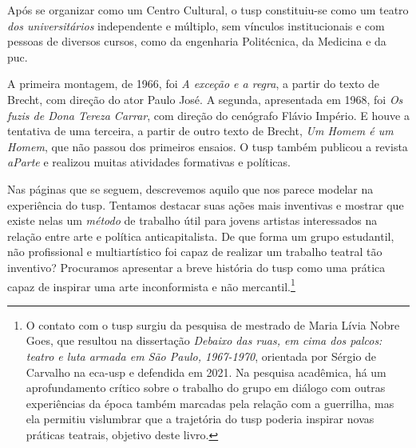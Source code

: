 Após se organizar como um Centro Cultural, o {\sc tusp} constituiu-se como um
teatro {\it dos universitários} independente e múltiplo, sem vínculos
institucionais e com pessoas de diversos cursos, como da engenharia
Politécnica, da Medicina e da {\sc puc}.


A primeira montagem, de 1966, foi {\it A exceção e a regra}, a partir do
texto de Brecht, com direção do ator Paulo José. A segunda, apresentada
em 1968, foi {\it Os fuzis de Dona Tereza Carrar}, com direção do
cenógrafo Flávio Império. E houve a tentativa de uma terceira, a partir
de outro texto de Brecht, {\it Um Homem é um Homem}, que não passou dos
primeiros ensaios. O {\sc tusp} também publicou a revista {\it aParte} e realizou
muitas atividades formativas e políticas.

Nas páginas que se seguem, descrevemos aquilo que nos parece modelar na
experiência do {\sc tusp}. Tentamos destacar suas ações mais inventivas e
mostrar que existe nelas um {\it método} de trabalho útil para jovens
artistas interessados na relação entre arte e política anticapitalista.
De que forma um grupo estudantil, não profissional e multiartístico foi
capaz de realizar um trabalho teatral tão inventivo? Procuramos
apresentar a breve história do {\sc tusp} como uma prática capaz de inspirar
uma arte inconformista e não mercantil.\footnote{O contato com o
  {\sc tusp} surgiu da pesquisa de mestrado de Maria Lívia Nobre Goes, que
  resultou na dissertação {\it Debaixo das ruas, em cima dos palcos:
  teatro e luta armada em São Paulo, 1967-1970}, orientada por Sérgio de
  Carvalho na {\sc eca-usp} e defendida em 2021. Na pesquisa acadêmica, há um
  aprofundamento crítico sobre o trabalho do grupo em diálogo com outras
  experiências da época também marcadas pela relação com a guerrilha,
  mas ela permitiu vislumbrar que a trajetória do {\sc tusp} poderia inspirar
  novas práticas teatrais, objetivo deste livro.}


